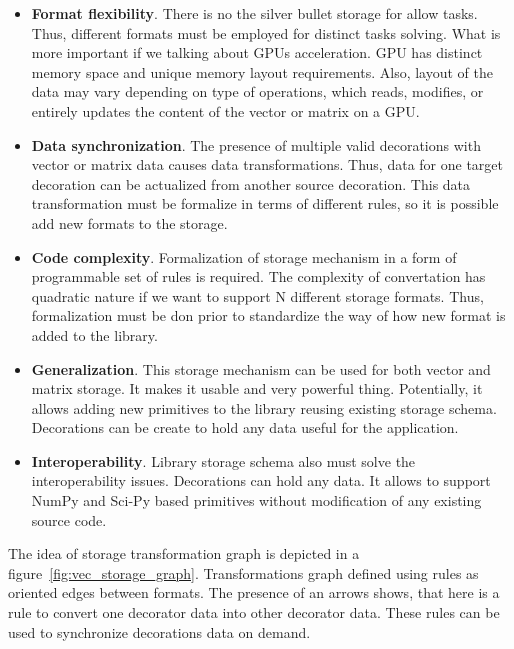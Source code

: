 \begin{itemize}
    \item \textbf{Format flexibility}. There is no the silver bullet storage for allow tasks. Thus, different formats must be employed for distinct tasks solving. What is more important if we talking about GPUs acceleration. GPU has distinct memory space and unique memory layout requirements. Also, layout of the data may vary depending on type of operations, which reads, modifies, or entirely updates the content of the vector or matrix on a GPU. 

    \item \textbf{Data synchronization}. The presence of multiple valid decorations with vector or matrix data causes data transformations. Thus, data for one target decoration can be actualized from another source decoration. This data transformation must be formalize in terms of different rules, so it is possible add new formats to the storage.

    \item \textbf{Code complexity}. Formalization of storage mechanism in a form of programmable set of rules is required. The complexity of convertation has quadratic nature if we want to support N different storage formats. Thus, formalization must be don prior to standardize the way of how new format is added to the library. 

    \item \textbf{Generalization}. This storage mechanism can be used for both vector and matrix storage. It makes it usable and very powerful thing. Potentially, it allows adding new primitives to the library reusing existing storage schema. Decorations can be create to hold any data useful for the application.

    \item \textbf{Interoperability}. Library storage schema also must solve the interoperability issues. Decorations can hold any data. It allows to support NumPy and Sci-Py based primitives without modification of any existing source code.
\end{itemize}

The idea of storage transformation graph is depicted in a figure~\ref{fig:vec_storage_graph}. Transformations graph defined using rules as oriented edges between formats. The presence of an arrows shows, that here is a rule to convert one decorator data into other decorator data. These rules can be used to synchronize decorations data on demand. 

